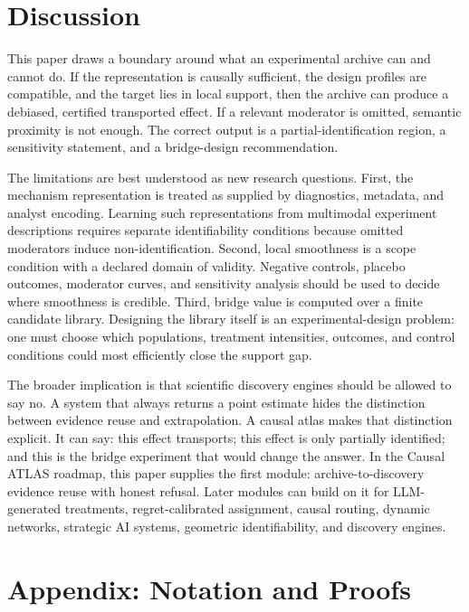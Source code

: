 \documentclass[11pt]{article}
\numberwithin{equation}{section}
\newcommand{\1}{\mathbf 1}
\begin{document}
\section{Discussion}
\label{sec:discussion}

This paper draws a boundary around what an experimental archive can and cannot do.  If the representation is causally sufficient, the design profiles are compatible, and the target lies in local support, then the archive can produce a debiased, certified transported effect.  If a relevant moderator is omitted, semantic proximity is not enough.  The correct output is a partial-identification region, a sensitivity statement, and a bridge-design recommendation.

The limitations are best understood as new research questions.  First, the mechanism representation is treated as supplied by diagnostics, metadata, and analyst encoding.  Learning such representations from multimodal experiment descriptions requires separate identifiability conditions because omitted moderators induce non-identification.  Second, local smoothness is a scope condition with a declared domain of validity.  Negative controls, placebo outcomes, moderator curves, and sensitivity analysis should be used to decide where smoothness is credible.  Third, bridge value is computed over a finite candidate library.  Designing the library itself is an experimental-design problem: one must choose which populations, treatment intensities, outcomes, and control conditions could most efficiently close the support gap.

The broader implication is that scientific discovery engines should be allowed to say no.  A system that always returns a point estimate hides the distinction between evidence reuse and extrapolation.  A causal atlas makes that distinction explicit.  It can say: this effect transports; this effect is only partially identified; and this is the bridge experiment that would change the answer.  In the Causal ATLAS roadmap, this paper supplies the first module: archive-to-discovery evidence reuse with honest refusal.  Later modules can build on it for LLM-generated treatments, regret-calibrated assignment, causal routing, dynamic networks, strategic AI systems, geometric identifiability, and discovery engines.

\appendix

\section{Appendix: Notation and Proofs}
\label{app:proofs}
\end{document}
